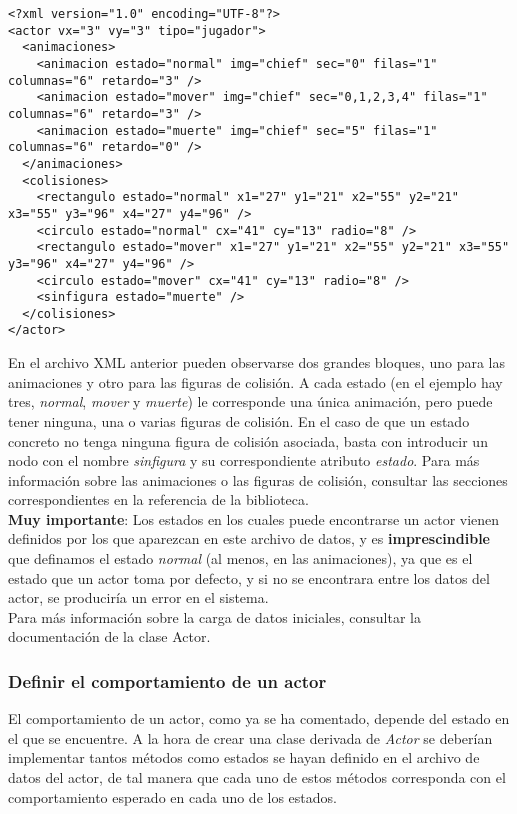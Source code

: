 \begin{lstlisting}[style=XML]
<?xml version="1.0" encoding="UTF-8"?>
<actor vx="3" vy="3" tipo="jugador">
  <animaciones>
    <animacion estado="normal" img="chief" sec="0" filas="1" columnas="6" retardo="3" />
    <animacion estado="mover" img="chief" sec="0,1,2,3,4" filas="1" columnas="6" retardo="3" />
    <animacion estado="muerte" img="chief" sec="5" filas="1" columnas="6" retardo="0" />
  </animaciones>
  <colisiones>
    <rectangulo estado="normal" x1="27" y1="21" x2="55" y2="21" x3="55" y3="96" x4="27" y4="96" />
    <circulo estado="normal" cx="41" cy="13" radio="8" />
    <rectangulo estado="mover" x1="27" y1="21" x2="55" y2="21" x3="55" y3="96" x4="27" y4="96" />
    <circulo estado="mover" cx="41" cy="13" radio="8" />
    <sinfigura estado="muerte" />
  </colisiones>
</actor>
\end{lstlisting}

En el archivo XML anterior pueden observarse dos grandes bloques, uno para las animaciones y otro para las figuras de colisión. A cada estado (en el ejemplo hay tres, \emph{normal}, \emph{mover} y \emph{muerte}) le corresponde una única animación, pero puede tener ninguna, una o varias figuras de colisión. En el caso de que un estado concreto no tenga ninguna figura de colisión asociada, basta con introducir un nodo con el nombre \emph{sinfigura} y su correspondiente atributo \emph{estado}. Para más información sobre las animaciones o las figuras de colisión, consultar las secciones correspondientes en la referencia de la biblioteca.\\

\textbf{Muy importante}: Los estados en los cuales puede encontrarse un actor vienen definidos por los que aparezcan en este archivo de datos, y es \textbf{imprescindible} que definamos el estado \emph{normal} (al menos, en las animaciones), ya que es el estado que un actor toma por defecto, y si no se encontrara entre los datos del actor, se produciría un error en el sistema.\\

Para más información sobre la carga de datos iniciales, consultar la documentación de la clase Actor.

\subsubsection{Definir el comportamiento de un actor}

El comportamiento de un actor, como ya se ha comentado, depende del estado en el que se encuentre. A la hora de crear una clase derivada de \emph{Actor} se deberían implementar tantos métodos como estados se hayan definido en el archivo de datos del actor, de tal manera que cada uno de estos métodos corresponda con el comportamiento esperado en cada uno de los estados.\\

